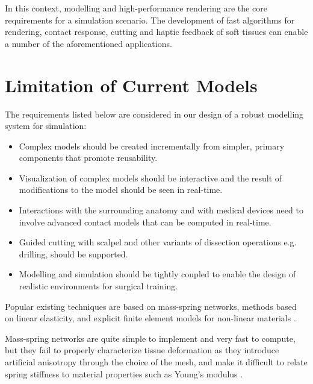 In this context, modelling and high-performance rendering are the core requirements for a simulation 
scenario. The development of fast algorithms for rendering, contact response, cutting and haptic 
feedback of soft tissues can enable a number of the aforementioned applications.


\section{Limitation of Current Models}
\label{sec:limitationsOfCurrentModels}

The requirements listed below are considered in our design of a robust modelling system for simulation:

\begin{itemize}
  \item Complex models should be created incrementally from simpler, primary 
  components that promote reusability.
  \item Visualization of complex models should be interactive and the result of modifications to the model should be
  seen in real-time.
  \item Interactions with the surrounding anatomy and with medical devices need to involve advanced 
  contact models that can be computed in real-time.
  
  \item Guided cutting with scalpel and other variants of dissection operations e.g. drilling, should be supported.
   
  \item Modelling and simulation should be tightly coupled to enable the design of realistic environments 
  for surgical training.
\end{itemize}


Popular existing techniques are based on mass-spring networks, methods based on linear elasticity, and explicit 
finite element models for non-linear materials \cite{Gibson1997a,Meier2005}. 

Mass-spring networks are quite simple to implement and very fast to compute, but they fail to properly 
characterize tissue deformation as they introduce artificial anisotropy through the choice of the 
mesh, and make it difficult to relate spring stiffness to material properties such as Young's modulus 
\cite{Courtecuisse2010}.

